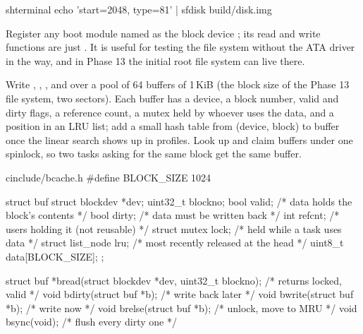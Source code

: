 \documentclass[11pt,a4paper]{article}
\begin{document}
\begin{lst}{sh}{terminal}
echo 'start=2048, type=81' | sfdisk build/disk.img
\end{lst}

Register any boot module named  as the block device ; its read and write functions are just
. It is useful for testing the file system without the ATA driver in the way, and in Phase 13 the initial
root file system can live there.

Write , , ,  and  over a pool of 64 buffers of
1\,KiB (the block size of the Phase 13 file system, two sectors). Each buffer has a device, a block number, valid and
dirty flags, a reference count, a mutex held by whoever uses the data, and a position in an LRU list; add a small hash
table from (device, block) to buffer once the linear search shows up in profiles. Look up and claim buffers under one
spinlock, so two tasks asking for the same block get the same buffer.

\begin{lst}{c}{include/bcache.h}
#define BLOCK_SIZE 1024

struct buf {
    struct blockdev *dev;
    uint32_t         blockno;
    bool             valid;             /* data holds the block's contents    */
    bool             dirty;             /* data must be written back          */
    int              refcnt;            /* users holding it (not reusable)    */
    struct mutex     lock;              /* held while a task uses data        */
    struct list_node lru;               /* most recently released at the head */
    uint8_t          data[BLOCK_SIZE];
};

struct buf *bread(struct blockdev *dev, uint32_t blockno);   /* returns locked, valid */
void        bdirty(struct buf *b);                            /* write back later       */
void        bwrite(struct buf *b);                            /* write now              */
void        brelse(struct buf *b);                            /* unlock, move to MRU    */
void        bsync(void);                                      /* flush every dirty one  */
\end{lst}
\end{document}
